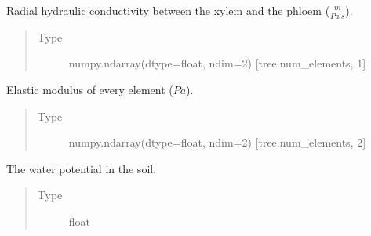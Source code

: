 \documentclass[letterpaper,10pt,english]{sphinxmanual}
\begin{document}
\begin{fulllineitems}
\begin{fulllineitems}
\begin{quote}
\begin{description}
\end{description}\end{quote}

\end{fulllineitems}


\begin{fulllineitems}
\label{\detokenize{index:src.tree.Tree.radial_hydraulic_conductivity}}
Radial hydraulic
conductivity between the xylem and the phloem (\(\frac{m}{Pa \: s}\)).
\begin{quote}\begin{description}
\item[{Type}] \leavevmode
numpy.ndarray(dtype=float, ndim=2) {[}tree.num\_elements, 1{]}

\end{description}\end{quote}

\end{fulllineitems}


\begin{fulllineitems}
\label{\detokenize{index:src.tree.Tree.elastic_modulus}}
Elastic modulus of every element
(\(Pa\)).
\begin{quote}\begin{description}
\item[{Type}] \leavevmode
numpy.ndarray(dtype=float, ndim=2) {[}tree.num\_elements, 2{]}

\end{description}\end{quote}

\end{fulllineitems}


\begin{fulllineitems}
\label{\detokenize{index:src.tree.Tree.ground_water_potential}}
The water potential in the soil.
\begin{quote}\begin{description}
\item[{Type}] \leavevmode
float


\end{description}
\end{quote}
\end{fulllineitems}
\end{fulllineitems}
\end{document}

